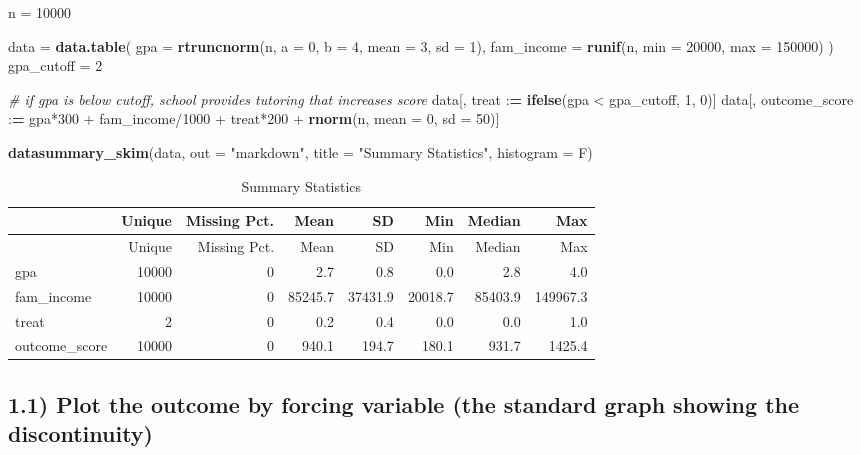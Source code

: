 \documentclass[]{article}
\newenvironment{Shaded}{\begin{snugshade}}{\end{snugshade}}
\newcommand{\KeywordTok}[1]{\textcolor[rgb]{0.13,0.29,0.53}{\textbf{{#1}}}}
\newcommand{\DataTypeTok}[1]{\textcolor[rgb]{0.13,0.29,0.53}{{#1}}}
\newcommand{\DecValTok}[1]{\textcolor[rgb]{0.00,0.00,0.81}{{#1}}}
\newcommand{\StringTok}[1]{\textcolor[rgb]{0.31,0.60,0.02}{{#1}}}
\newcommand{\CommentTok}[1]{\textcolor[rgb]{0.56,0.35,0.01}{\textit{{#1}}}}
\newcommand{\ErrorTok}[1]{\textcolor[rgb]{0.64,0.00,0.00}{\textbf{{#1}}}}
\newcommand{\NormalTok}[1]{{#1}}
\begin{document}
\begin{Shaded}
\begin{Highlighting}[]
\NormalTok{n =}\StringTok{ }\DecValTok{10000}

\NormalTok{data =}\StringTok{ }\KeywordTok{data.table}\NormalTok{(}
  \DataTypeTok{gpa =} \KeywordTok{rtruncnorm}\NormalTok{(n, }\DataTypeTok{a =} \DecValTok{0}\NormalTok{, }\DataTypeTok{b =} \DecValTok{4}\NormalTok{, }\DataTypeTok{mean =} \DecValTok{3}\NormalTok{, }\DataTypeTok{sd =} \DecValTok{1}\NormalTok{),}
  \DataTypeTok{fam_income =} \KeywordTok{runif}\NormalTok{(n, }\DataTypeTok{min =} \DecValTok{20000}\NormalTok{, }\DataTypeTok{max =} \DecValTok{150000}\NormalTok{)}
\NormalTok{)}
\NormalTok{gpa_cutoff =}\StringTok{ }\DecValTok{2}

\CommentTok{# if gpa is below cutoff, school provides tutoring that increases score}
\NormalTok{data[, treat :}\ErrorTok{=}\StringTok{ }\KeywordTok{ifelse}\NormalTok{(gpa <}\StringTok{ }\NormalTok{gpa_cutoff, }\DecValTok{1}\NormalTok{, }\DecValTok{0}\NormalTok{)]}
\NormalTok{data[, outcome_score :}\ErrorTok{=}\StringTok{ }\NormalTok{gpa*}\DecValTok{300} \NormalTok{+}\StringTok{ }\NormalTok{fam_income/}\DecValTok{1000} \NormalTok{+}\StringTok{ }\NormalTok{treat*}\DecValTok{200} \NormalTok{+}\StringTok{ }\KeywordTok{rnorm}\NormalTok{(n, }\DataTypeTok{mean =} \DecValTok{0}\NormalTok{, }\DataTypeTok{sd =} \DecValTok{50}\NormalTok{)]}

\KeywordTok{datasummary_skim}\NormalTok{(data, }\DataTypeTok{out =} \StringTok{"markdown"}\NormalTok{, }\DataTypeTok{title =} \StringTok{"Summary Statistics"}\NormalTok{, }\DataTypeTok{histogram =} \NormalTok{F)}
\end{Highlighting}
\end{Shaded}

\begin{longtable}[c]{@{}lrrrrrrr@{}}
\caption{Summary Statistics}\tabularnewline
\toprule
& Unique & Missing Pct. & Mean & SD & Min & Median & Max\tabularnewline
\midrule
\endfirsthead
\toprule
& Unique & Missing Pct. & Mean & SD & Min & Median & Max\tabularnewline
\midrule
\endhead
gpa & 10000 & 0 & 2.7 & 0.8 & 0.0 & 2.8 & 4.0\tabularnewline
fam\_income & 10000 & 0 & 85245.7 & 37431.9 & 20018.7 & 85403.9 &
149967.3\tabularnewline
treat & 2 & 0 & 0.2 & 0.4 & 0.0 & 0.0 & 1.0\tabularnewline
outcome\_score & 10000 & 0 & 940.1 & 194.7 & 180.1 & 931.7 &
1425.4\tabularnewline
\bottomrule
\end{longtable}

\subsection{1.1) Plot the outcome by forcing variable (the standard
graph showing the
discontinuity)}\label{plot-the-outcome-by-forcing-variable-the-standard-graph-showing-the-discontinuity}
\end{document}
